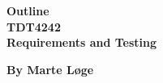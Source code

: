 \begin{titlepage}
\begin{center}

{\Huge \bf Outline} \\[1.0cm]
{\Huge \bf TDT4242} \\[1.0cm]
{\Large \bf Requirements and Testing} \\[1.0cm]
\vspace{1cm}

{\bf By Marte Løge}


\end{center}
\end{titlepage}